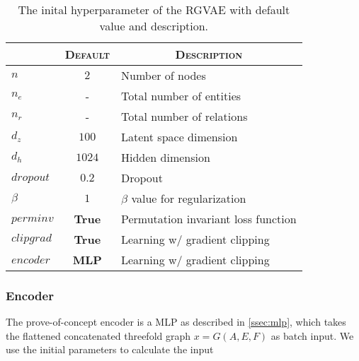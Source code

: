 \begin{table}[H]
\centering
    \begin{tabular}{|l|l|l|}
    \hline
    \rowcolor[HTML]{EFEFEF}
    \multicolumn{1}{|c}{\textsc{Hyerp.}} & \multicolumn{1}{c}{\textsc{Default}} & \multicolumn{1}{c|}{\textsc{Description}} \\\hline
    $n$     & \multicolumn{1}{c|}{$2$} & Number of nodes  \\
    $n_e$   &\multicolumn{1}{c|}{-}   & Total number of entities\\
    $n_r$   &\multicolumn{1}{c|}{-} & Total number of relations\\
    $d_z$ &\multicolumn{1}{c|}{$100$}   & Latent space dimension\\
    $d_h$ &\multicolumn{1}{c|}{$1024$}   & Hidden dimension\\
    $dropout$ &\multicolumn{1}{c|}{$0.2$}   & Dropout\\
    $\beta$ & \multicolumn{1}{c|}{$1$}  & $\beta$ value for regularization  \\
    $perminv$ & \multicolumn{1}{c|}{\textbf{True}}  & Permutation invariant loss function  \\
    $clipgrad$ & \multicolumn{1}{c|}{\textbf{True}}  & Learning w/ gradient clipping  \\
    $encoder$ & \multicolumn{1}{c|}{\textbf{MLP}}  & Learning w/ gradient clipping  \\
    \hline
    \end{tabular}
\label{tab:RGVAE}
\caption{The inital hyperparameter of the RGVAE with default value and description.}
\end{table}


\subsubsection{Encoder}

The prove-of-concept encoder is a MLP as described in \ref{ssec:mlp}, which takes the flattened concatenated threefold graph $x=G(A,E,F)$ as batch input. We use the initial parameters to calculate the input

